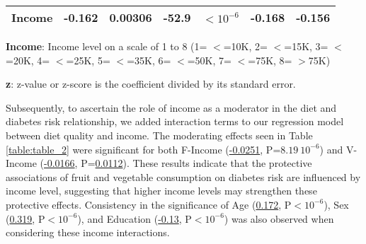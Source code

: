 \documentclass[11pt]{article}
\begin{document}
\begin{table}[h]
\begin{threeparttable}
{\begin{tabular}{lllllll}
\textbf{Income} & \raisebox{2ex}{\hypertarget{A7a}{}}-0.162 & \raisebox{2ex}{\hypertarget{A7b}{}}0.00306 & \raisebox{2ex}{\hypertarget{A7c}{}}-52.9 & $<$\raisebox{2ex}{\hypertarget{A7d}{}}$10^{-6}$ & \raisebox{2ex}{\hypertarget{A7e}{}}-0.168 & \raisebox{2ex}{\hypertarget{A7f}{}}-0.156 \\
\bottomrule
\end{tabular}}
\begin{tablenotes}
\footnotesize
\item \textbf{Income}: Income level on a scale of 1 to 8 (1= $<$=10K, 2= $<$=15K, 3= $<$=20K, 4= $<$=25K, 5= $<$=35K, 6= $<$=50K, 7= $<$=75K, 8= $>$75K)
\item \textbf{z}: z-value or z-score is the coefficient divided by its standard error.
\end{tablenotes}
\end{threeparttable}
\end{table}


Subsequently, to ascertain the role of income as a moderator in the diet and diabetes risk relationship, we added interaction terms to our regression model between diet quality and income. The moderating effects seen in Table {}\ref{table:table_2} were significant for both F-Income (\hyperlink{B5a}{-0.0251}, P=\hyperlink{B5d}{$8.19\ 10^{-6}$}) and V-Income (\hyperlink{B6a}{-0.0166}, P=\hyperlink{B6d}{0.0112}). These results indicate that the protective associations of fruit and vegetable consumption on diabetes risk are influenced by income level, suggesting that higher income levels may strengthen these protective effects. Consistency in the significance of Age (\hyperlink{B7a}{0.172}, P$<$\hyperlink{B7d}{$10^{-6}$}), Sex (\hyperlink{B8a}{0.319}, P$<$\hyperlink{B8d}{$10^{-6}$}), and Education (\hyperlink{B9a}{-0.13}, P$<$\hyperlink{B9d}{$10^{-6}$}) was also observed when considering these income interactions.
\end{document}
